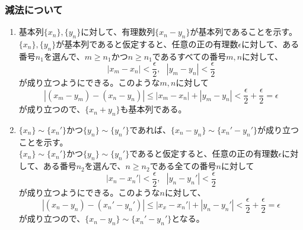 \documentclass{jsarticle}
\begin{document}
\subsubsection{減法について}
\begin{enumerate}
\item
基本列$\{x_n\},\{y_n\}$に対して、有理数列$\{x_n-y_n\}$が基本列であることを示す。\\
$\{x_n\},\{y_n\}$が基本列であると仮定すると、任意の正の有理数$\epsilon$に対して、ある番号$n_1$を選んで、$m\geq n_1$かつ$n\geq n_1$であるすべての番号$m,n$に対して、
\[|x_m-x_n|<\frac{\epsilon}{2},\ \ \ |y_m-y_n|<\frac{\epsilon}{2}\]
が成り立つようにできる。このような$m,n$に対して
\[|(x_m-y_m)-(x_n-y_n)|\leq|x_m-x_n|+|y_m-y_n|< \frac{\epsilon}{2}+\frac{\epsilon}{2}=\epsilon\]
が成り立つので、$\{x_n+y_n\}$も基本列である。

\item
$\{x_n\}\sim\{x_n'\}$かつ$\{y_n\}\sim\{y_n'\}$であれば、$\{x_n-y_n\}\sim\{x_n'-y_n'\}$が成り立つことを示す。\\
$\{x_n\}\sim\{x_n'\}$かつ$\{y_n\}\sim\{y_n'\}$であると仮定すると、任意の正の有理数$\epsilon$に対して、ある番号$n_2$を選んで、$n\geq n_2$である全ての番号$n$に対して
\[|x_n-x_n'|<\frac{\epsilon}{2},\ \ \ |y_n-y_n'|<\frac{\epsilon}{2}\]
が成り立つようにできる。このような$n$に対して、
\[|(x_n-y_n)-(x_n'-y_n')|\leq|x_x-x_n'|+|y_n-y_n'|< \frac{\epsilon}{2}+\frac{\epsilon}{2}=\epsilon\]
が成り立つので、$\{x_n-y_n\}\sim\{x_n'-y_n'\}$となる。
\end{enumerate}

\end{document}
